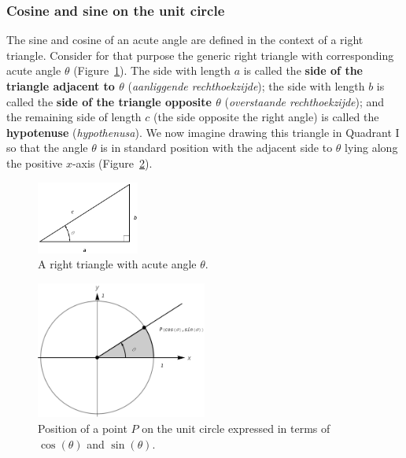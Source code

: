 \subsubsection{Cosine and sine on the unit circle}
The sine and cosine of an acute angle are defined in the context of a right triangle. Consider for that purpose the generic right triangle  with corresponding acute angle $\theta$ (Figure~\ref{fig_trans_11}). The side with length $a$ is called the \textbf{side of the triangle adjacent to  $\theta$} (\textit{aanliggende rechthoekzijde}); the side with length $b$ is called the \textbf{side of the triangle opposite $\theta$} (\textit{overstaande rechthoekzijde}); and the remaining side of length $c$ (the side opposite the right angle) is called the \textbf{hypotenuse} (\textit{hypothenusa}). We now imagine drawing this triangle in Quadrant I  so that the angle $\theta$ is in standard position with the adjacent side to $\theta$ lying along the positive $x$-axis (Figure~\ref{fig_trans_12}). 


\begin{figure}[H]
\centering
\centerline{
\includegraphics[width=0.3\textwidth]{fig_trans_11}}
	\caption{A right triangle with acute angle $\theta$. }
	\label{fig_trans_11}
\end{figure}

\begin{figure}[h]
	\begin{center}
			\includegraphics[width=0.5\textwidth]{fig_trans_12}
	\caption{Position of a point $P$ on the unit circle expressed in terms of $\cos(\theta)$ and $\sin(\theta)$. }
	\label{fig_trans_12}
	\end{center}
\end{figure}


